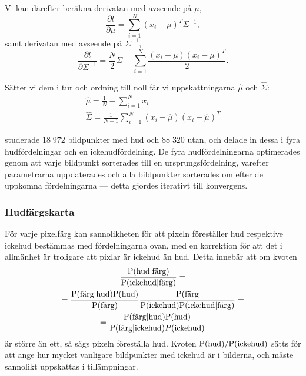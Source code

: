 \documentclass[../rapport_MVEX01-11-05]{subfiles}
\begin{document}
Vi kan därefter beräkna derivatan med avseende på $\mu$,
\begin{equation*}
  \frac{\partial l}{\partial \mu}=\sum_{i=1}^N(x_i-\mu)^T\Sigma^{-1},
\end{equation*}
samt derivatan med avseende på $\Sigma^{-1}$,
\begin{equation*}
  \frac{\partial l}{\partial \Sigma^{-1}}=\frac{N}{2}\Sigma
  -\sum_{i=1}^N\frac{(x_i-\mu)(x_i-\mu)^T}{2}.
\end{equation*}

Sätter vi dem i tur och ordning till noll får vi uppskattningarna $\hat\mu$ och $\hat\Sigma$:
\begin{gather*}
  \hat\mu    =\frac{1}{N}-\sum_{i=1}^Nx_i\\
  \hat\Sigma =\frac{1}{N-1}\sum_{i=1}^N(x_i-\hat\mu)(x_i-\hat\mu)^T
\end{gather*}

 studerade $18\;972$
bildpunkter med hud och $88\;320$ utan, och delade in dessa i fyra
hudfördelningar och en ickehudfördelning. De fyra hudfördelningarna
optimerades genom att varje bildpunkt sorterades till en
ursprungsfördelning, varefter parametrarna uppdaterades och alla
bildpunkter sorterades om efter de uppkomna fördelningarna --- detta gjordes
iterativt till konvergens.

\subsubsection{Hudfärgskarta}

För varje pixelfärg kan sannolikheten för att pixeln föreställer hud
respektive ickehud bestämmas med fördelningarna ovan, med en korrektion
för att det i allmänhet är troligare att pixlar är ickehud än hud. Detta
innebär att om kvoten
\begin{multline*}
\frac{\mathrm{P}(\textrm{hud}|\textrm{färg})}{\mathrm{P}(\textrm{ickehud}|\textrm{färg})}=\\
=\frac{\mathrm{P}(\textrm{färg}|\textrm{hud})\mathrm{P}(\textrm{hud})}{\mathrm{P}(\textrm{färg})}
 \frac{\mathrm{P}(\textrm{färg}}{\mathrm{P}(\textrm{ickehud})\mathrm{P}(\textrm{ickehud}|\textrm{färg})}=\\
=\frac{\mathrm{P}(\textrm{färg}|\textrm{hud})\mathrm{P}(\textrm{hud})}{\mathrm{P}(\textrm{färg}|\textrm{ickehud})
 P(\textrm{ickehud})}
\end{multline*}
är större än ett, så sägs pixeln föreställa hud. Kvoten
$\mathrm{P}(\textrm{hud})/\mathrm{P}(\textrm{ickehud})$ sätts för att ange hur mycket vanligare
bildpunkter med ickehud är i bilderna, och måste sannolikt uppskattas i 
tillämpningar.
\end{document}
